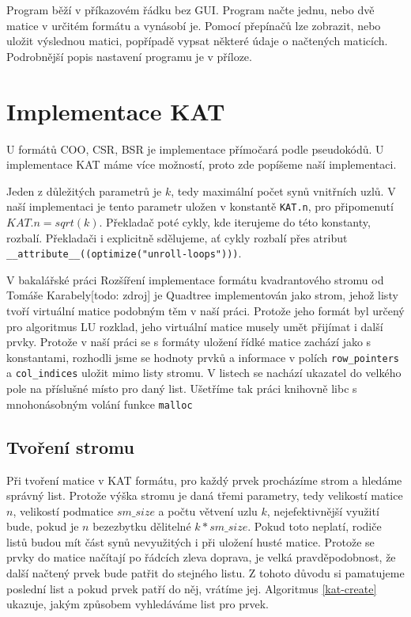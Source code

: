 Program běží v příkazovém řádku bez GUI. Program načte jednu, nebo dvě matice v určitém formátu a vynásobí je. Pomocí přepínačů lze zobrazit, nebo uložit výslednou matici, popřípadě vypsat některé údaje o načtených maticích. Podrobnější popis nastavení programu je v příloze.


\section{Implementace KAT}

U formátů COO, CSR, BSR je implementace přímočará podle pseudokódů. U implementace KAT máme více možností, proto zde popíšeme naší implementaci.

Jeden z důležitých parametrů je $k$, tedy maximální počet synů vnitřních uzlů. V naší implementaci je tento parametr uložen v konstantě \texttt{KAT.n}, pro připomenutí $KAT.n = sqrt(k)$. Překladač poté cykly, kde iterujeme do této konstanty, rozbalí. Překladači i explicitně sdělujeme, ať cykly rozbalí přes atribut \texttt{\_\_attribute\_\_((optimize("unroll-loops")))}.

V bakalářské práci Rozšíření implementace formátu kvadrantového stromu od Tomáše Karabely[todo: zdroj] je Quadtree implementován jako strom, jehož listy tvoří virtuální matice podobným těm v naší práci. Protože jeho formát byl určený pro algoritmus LU rozklad, jeho virtuální matice musely umět přijímat i další prvky. Protože v naší práci se s formáty uložení řídké matice zachází jako s konstantami, rozhodli jsme se hodnoty prvků a informace v polích \texttt{row\_pointers} a \texttt{col\_indices} uložit mimo listy stromu. V listech se nachází ukazatel do velkého pole na příslušné místo pro daný list. Ušetříme tak práci knihovně libc s mnohonásobným volání funkce \texttt{malloc}

\subsection{Tvoření stromu}

Při tvoření matice v KAT formátu, pro každý prvek procházíme strom a hledáme správný list. Protože výška stromu je daná třemi parametry, tedy velikostí matice $n$, velikostí podmatice $sm\_size$ a počtu větvení uzlu $k$, nejefektivnější využití bude, pokud je $n$ bezezbytku dělitelné $k * sm\_size$. Pokud toto neplatí, rodiče listů budou mít část synů nevyužitých i při uložení husté matice. Protože se prvky do matice načítají po řádcích zleva doprava, je velká pravděpodobnost, že další načtený prvek bude patřit do stejného listu. Z tohoto důvodu si pamatujeme poslední list a pokud prvek patří do něj, vrátíme jej. Algoritmus \ref{kat-create} ukazuje, jakým způsobem vyhledáváme list pro prvek.


